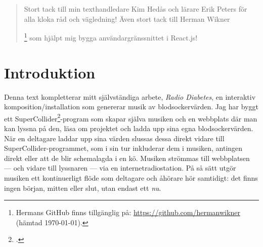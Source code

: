 \documentclass[11pt, a4paper]{article} %
\newcommand{\symfootnote}[1]{%
\let\oldthefootnote=\thefootnote%
\stepcounter{mpfootnote}%
\addtocounter{footnote}{-1}%
\renewcommand{\thefootnote}{$\star$}%
\footnote{#1}%
\let\thefootnote=\oldthefootnote%
}
\begin{document}
\clearpage


\newpage

\renewcommand{\abstractname}{Tack}
\begin{abstract}
  \noindent
Stort tack till min texthandledare Kim Hedås och lärare Erik Peters för alla kloka råd och vägledning! Även stort tack till Herman Wikner\symfootnote{Hermans GitHub finns tillgänglig på: \url{https://github.com/hermanwikner} (hämtad \today).} som hjälpt mig bygga användargränssnittet i React.js! 
\end{abstract}
\thispagestyle{empty}
\clearpage


\begin{singlespace}
  \tableofcontents
\end{singlespace}

\clearpage

\section*{Introduktion}
Denna text kompletterar mitt självständiga arbete, \emph{Radio Diabetes}, en interaktiv komposition/installation som genererar musik av blodsockervärden. Jag har byggt ett SuperCollider\footcite{noauthor_supercollider_nodate}-program som skapar själva musiken och en webbplats där man kan lyssna på den, läsa om projektet och ladda upp sina egna blodsockervärden. När en deltagare laddar upp sina värden slussas dessa direkt vidare till SuperCollider-programmet, som i sin tur inkluderar dem i musiken, antingen direkt eller att de blir schemalagda i en kö. Musiken strömmas till webbplatsen --- och vidare till lyssnaren --- via en internetradiostation. På så sätt utgör musiken ett kontinuerligt flöde som deltagare och åhörare hör samtidigt: det finns ingen början, mitten eller slut, utan endast ett \emph{nu}. %

\end{document}
